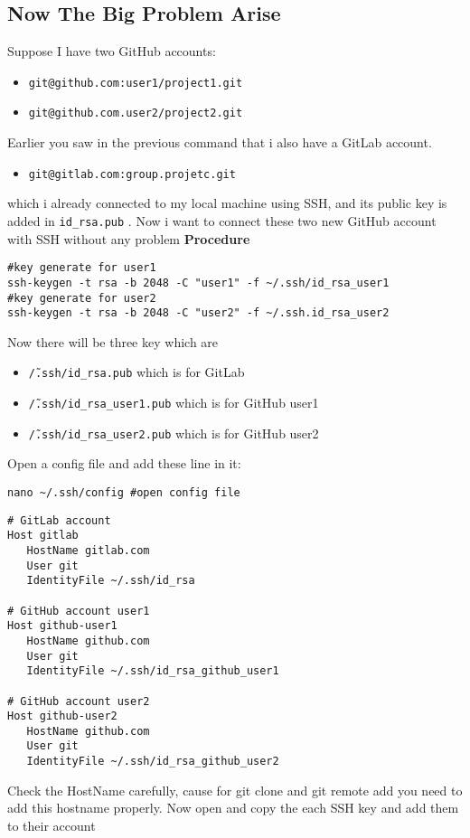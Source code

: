 \documentclass{article}
\begin{document}
\subsection{Now The Big Problem Arise}
Suppose I have two GitHub accounts:
\begin{itemize}
	\item \texttt{git@github.com:user1/project1.git}
	\item \texttt{git@github.com.user2/project2.git}	
\end{itemize}
Earlier you saw in the previous command that i also have a GitLab account. 
\begin{itemize}
	\item \texttt{git@gitlab.com:group.projetc.git}
	
\end{itemize}
which i already connected to my local machine using SSH, and its public key is added in \texttt{id\_rsa.pub} . 
Now i want to connect these two new GitHub account with SSH without any problem 
\textbf{Procedure}
\begin{lstlisting}
#key generate for user1 
ssh-keygen -t rsa -b 2048 -C "user1" -f ~/.ssh/id_rsa_user1
#key generate for user2
ssh-keygen -t rsa -b 2048 -C "user2" -f ~/.ssh.id_rsa_user2
\end{lstlisting}
Now there will be three key which are 
\begin{itemize}
	\item \texttt{\~/.ssh/id\_rsa.pub} which is for GitLab
        \item \texttt{\~/.ssh/id\_rsa\_user1.pub} which is for GitHub user1 
	\item \texttt{\~/.ssh/id\_rsa\_user2.pub} which is for GitHub user2	
	
\end{itemize}
Open a config file and add these line in it:

\begin{lstlisting}
nano ~/.ssh/config #open config file
\end{lstlisting}

\begin{lstlisting}
# GitLab account
Host gitlab
   HostName gitlab.com
   User git
   IdentityFile ~/.ssh/id_rsa

# GitHub account user1
Host github-user1
   HostName github.com
   User git
   IdentityFile ~/.ssh/id_rsa_github_user1

# GitHub account user2
Host github-user2
   HostName github.com
   User git
   IdentityFile ~/.ssh/id_rsa_github_user2

\end{lstlisting}
Check the HostName carefully, cause for git clone and git remote add you need to add this hostname properly. 
Now open and copy the each SSH key and add them to their account 
\end{document}
